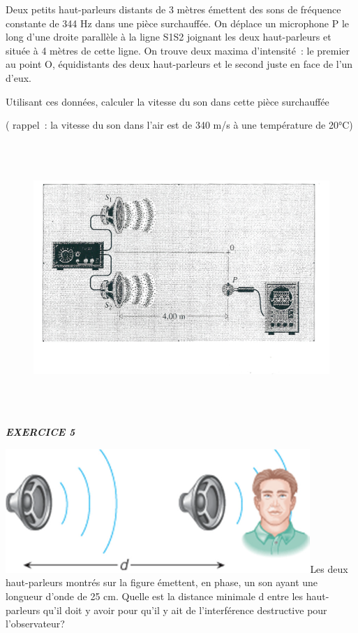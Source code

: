 {Deux petits haut-parleurs distants de 3 mètres émettent des sons de
fréquence constante de 344 Hz dans une pièce surchauffée. On déplace un
microphone P le long d'une droite parallèle à la ligne S1S2 joignant les
deux haut-parleurs et située à 4 mètres de cette ligne. On trouve deux
maxima d'intensité~: le premier au point O, équidistants des deux
haut-parleurs et le second juste en face de l'un d'eux.

Utilisant ces données, calculer la vitesse du son dans cette pièce
surchauffée

( rappel~: la vitesse du son dans l'air est de 340 m/s à une température
de 20°C)

\begin{figure}
\centering
\includegraphics[width=15.663cm,height=10.231cm]{Pictures/100000010000062500000404B4675BF2C4CE1EEC.png}
\caption{}
\end{figure}

\emph{\textbf{EXERCICE 5}}

\includegraphics[width=11.546cm,height=4.688cm]{Pictures/1000000100000363000001603D3E7105AB252F90.png}Les
deux haut-parleurs montrés sur la figure émettent, en phase, un son
ayant une longueur d'onde de 25 cm. Quelle est la distance minimale d
entre les haut-parleurs qu'il doit y avoir pour qu'il y ait de
l'interférence destructive pour l'observateur?

}
